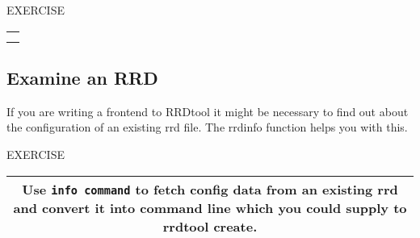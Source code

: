 \documentclass[a4paper,12pt]{article}
\newenvironment{work}{\textsf{\tiny EXERCISE}\nopagebreak\\[0.3ex]\begin{tabular}{|c|}
 \hline
 \begin{minipage}{0.965\linewidth}%
 \setlength{\parskip}{1.6ex plus 0.6ex minus 0.4ex}%
 \rule{0pt}{2.8ex}\ignorespaces}
{\rule[-1.8ex]{0pt}{0pt}\end{minipage}\\
 \hline
 \end{tabular}}
\newcommand{\ex}[1]{\subsection{#1}}
\newcommand{\cmd}[1]{\texttt{\mbox{#1}}}
\begin{document}
\begin{work}
\begin{work}
Use the \cmd{xport} function to extract chart data from an rrd file and create a chart using the d3 library.
\end{work} 

\ex{Examine an RRD}

If you are writing a frontend to RRDtool it might be necessary to
find out about the configuration of an existing rrd file. The rrdinfo
function helps you with this.

\begin{work}
  Use \texttt{info command} to fetch config data from an existing rrd
  and convert it into command line which you could supply to rrdtool
  create.
\end{work}
\end{document}
